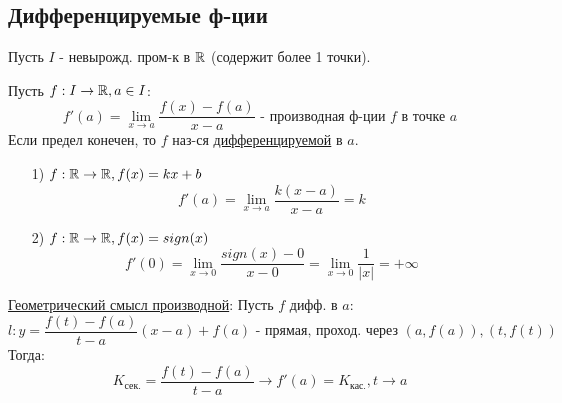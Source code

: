 \subsection{Дифференцируемые ф-ции}
Пусть $I$ - невырожд. пром-к в $\mathbb{R}$ (содержит более 1 точки).
\begin{definition}
  Пусть $f: I \rightarrow \mathbb{R}, a \in I$:
  \[
  f'(a) = \lim_{x\to a} \frac{f(x) - f(a)}{x - a} \text{ - производная ф-ции $f$ в точке $a$}
  \]
  Если предел конечен, то $f$ наз-ся \underline{дифференцируемой} в $a$.
\end{definition}
\begin{example}
\begin{itemize}
  \item [1) ] $f: \mathbb{R} \rightarrow \mathbb{R}, f(x) = kx + b$
    \[
    f'(a) = \lim_{x\to a} \frac{k(x - a)}{x - a} = k
    \]
  \item [2) ] $f: \mathbb{R} \rightarrow \mathbb{R}, f(x) = sign(x)$ 
    \[
    f'(0) = \lim_{x\to 0} \frac{sign(x) - 0}{x - 0} = \lim_{x\to 0} \frac{1}{\left|x\right|} = +\infty
    \]
\end{itemize}
\end{example}
\underline{Геометрический смысл производной}: Пусть $f$ дифф. в $a$:
\[
l \colon y = \frac{f(t) - f(a)}{t - a}(x - a) + f(a) \text{ - прямая, проход. через $(a, f(a)), (t, f(t))$}
\]
Тогда: 
\[
  K_{\text{сек.}} = \frac{f(t) - f(a)}{t - a} \rightarrow f'(a) = K_{\text{кас.}}, t \rightarrow a
\]
